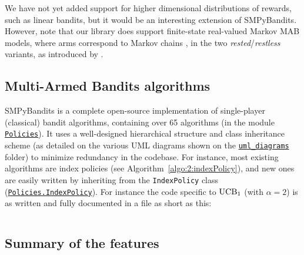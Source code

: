 We have not yet added support for higher dimensional distributions of rewards, such as linear bandits, but it would be an interesting extension of SMPyBandits.
%
However, note that our library does support finite-state real-valued Markov MAB models, where arms correspond to Markov chains \cite{Norris98}, in the two \emph{rested}/\emph{restless} variants, as introduced by \cite{Anantharam87b}.


\subsection{Multi-Armed Bandits algorithms}

SMPyBandits is a complete open-source implementation of single-player (classical) bandit algorithms,
containing over 65 algorithms (in the module \texttt{\href{https://SMPyBandits.GitHub.io/docs/Policies.html}{Policies}}).
It uses a well-designed hierarchical structure and class inheritance scheme (as detailed on the various UML diagrams shown on the \texttt{\href{https://SMPyBandits.GitHub.io/uml_diagrams/README.html}{uml\_diagrams}} folder) to minimize redundancy in the codebase.
For instance, most existing algorithms are index policies (see Algorithm~\ref{algo:2:indexPolicy}), and new ones are easily written by inheriting from the \texttt{IndexPolicy} class (\texttt{\href{https://SMPyBandits.GitHub.io/docs/Policies.IndexPolicy.html}{Policies.IndexPolicy}}).
For instance the code specific to $\mathrm{UCB}_1$ (with $\alpha=2$) is as written and fully documented in a file as short as this:

\begin{small}
    \inputminted[linenos=true,numbersep=5pt,frame=lines,framesep=2mm]{python3}{2-Chapters/3-Chapter/src/example_of_a_IndexPolicy_UCB.py}
\end{small}


\subsection{Summary of the features}

